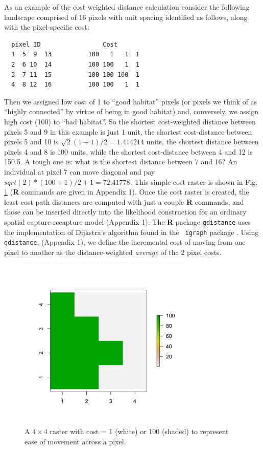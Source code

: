\documentclass[12pt]{article}
\begin{document}
\begin{spacing}{1.8}
As an example of the cost-weighted distance calculation consider the
following landscape comprised of 16 pixels with unit spacing
identified as follows, along with the pixel-specific cost:
\begin{center}
\begin{verbatim}
  pixel ID                 Cost
  1  5  9  13          100   1   1  1
  2  6 10  14          100 100   1  1
  3  7 11  15          100 100 100  1
  4  8 12  16          100 100   1  1
\end{verbatim}
\end{center}
Then we assigned low cost of 1 to ``good habitat'' pixels (or pixels
we think of as ``highly connected'' by virtue of being in good
habitat) and, conversely, we assign high cost (100) to ``bad
habitat''. So the shortest cost-weighted distance between pixels 5 and
9 in this example is just 1 unit, the shortest cost-distance between
pixels 5 and 10 is $\sqrt{2}(1+1)/2 = 1.414214$ units, the shortest
distance between pixels 4 and 8 is 100 units, while the shortest
cost-distance between 4 and 12 is 150.5. A tough one is: what is the
shortest distance between 7 and 16? An individual at pixel 7 can move
diagonal and pay $sqrt(2)*(100+1)/2 + 1 =72.41778$.  This simple cost
raster is shown in Fig. \ref{ecoldist.fig.raster} ({\bf R} commands
are given in Appendix 1).  Once the cost raster is created, the
least-cost path distances are computed with just a couple {\bf R}
commands, and those can be inserted directly into the likelihood
construction for an ordinary spatial capture-recapture model (Appendix
1). The {\bf R} package \mbox{\tt gdistance} uses the implementation
of Dijkstra's algorithm \citep{dijkstra:1959} found in the \mbox{\tt
  igraph} package \citep{csardi:2010}.  Using \mbox{\tt gdistance},
(Appendix 1), we define the incremental cost of moving from one pixel
to another as the distance-weighted {\it average} of the 2 pixel
costs.


\begin{figure}
\begin{center}
\includegraphics[height=3.25in,width=3.25in]{figs/raster_2values}
\end{center}
\caption{A $4 \times 4$ raster with cost = 1 (white) or 100 (shaded) to represent ease of movement across a pixel.}
\label{ecoldist.fig.raster}
\end{figure}


\end{spacing}
\end{document}
